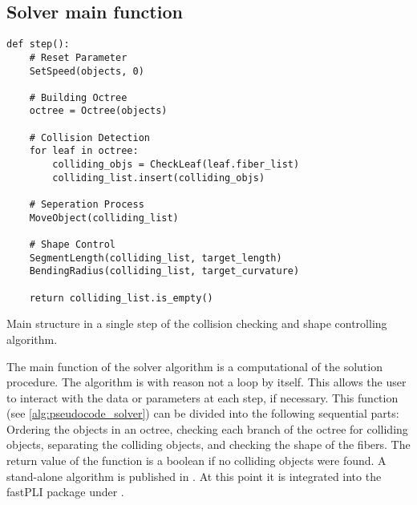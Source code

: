 \subsection{Solver main function}
%
\begin{lstfloat}[!tb]
\lstset{style=python}
\begin{lstlisting}[]
def step():
    # Reset Parameter
    SetSpeed(objects, 0)
   
    # Building Octree
    octree = Octree(objects)
   
    # Collision Detection
    for leaf in octree:
        colliding_objs = CheckLeaf(leaf.fiber_list)
        colliding_list.insert(colliding_objs)

    # Seperation Process
    MoveObject(colliding_list)

    # Shape Control
    SegmentLength(colliding_list, target_length)
    BendingRadius(colliding_list, target_curvature)

    return colliding_list.is_empty()
\end{lstlisting}
\caption{Main structure in a single step of the collision checking and shape controlling algorithm.}
\label{alg:pseudocode_solver}
\end{lstfloat}
%
The main function of the solver algorithm is a computational  of the solution procedure.
The algorithm is with reason not a loop by itself.
This allows the user to interact with the data or parameters at each step, if necessary.
This  function (see \cref{alg:pseudocode_solver}) can be divided into the following sequential parts:
Ordering the objects in an octree, checking each branch of the octree for colliding objects, separating the colliding objects, and checking the shape of the fibers.
The return value of the function is a boolean if no colliding objects were found.
A stand-alone algorithm is published in \cite{Matuschke2019}.
At this point it is integrated into the \ac{fastPLI} package under .
%
%
%
